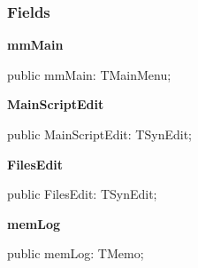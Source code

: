 \documentclass{report}
\newif\ifpdf
\begin{document}
\subsubsection*{\large{\textbf{Fields}}\normalsize\hspace{1ex}\hfill}
\begin{list}{}{
\setlength{\itemindent}{0cm}
\setlength{\listparindent}{0cm}
\setlength{\leftmargin}{\evensidemargin}
\addtolength{\leftmargin}{\tmplength}
\settowidth{\labelsep}{X}
\addtolength{\leftmargin}{\labelsep}
\setlength{\labelwidth}{\tmplength}
}
\label{editor.TfrmEditor-mmMain}
\item[\textbf{mmMain}\hfill]
\ifpdf
\begin{flushleft}
\fi
\begin{ttfamily}
public mmMain: TMainMenu;\end{ttfamily}

\ifpdf
\end{flushleft}
\fi


\par  \label{editor.TfrmEditor-MainScriptEdit}
\item[\textbf{MainScriptEdit}\hfill]
\ifpdf
\begin{flushleft}
\fi
\begin{ttfamily}
public MainScriptEdit: TSynEdit;\end{ttfamily}

\ifpdf
\end{flushleft}
\fi


\par  \label{editor.TfrmEditor-FilesEdit}
\item[\textbf{FilesEdit}\hfill]
\ifpdf
\begin{flushleft}
\fi
\begin{ttfamily}
public FilesEdit: TSynEdit;\end{ttfamily}

\ifpdf
\end{flushleft}
\fi


\par  \label{editor.TfrmEditor-memLog}
\item[\textbf{memLog}\hfill]
\ifpdf
\begin{flushleft}
\fi
\begin{ttfamily}
public memLog: TMemo;\end{ttfamily}

\ifpdf
\end{flushleft}
\fi



\end{list}
\end{document}
